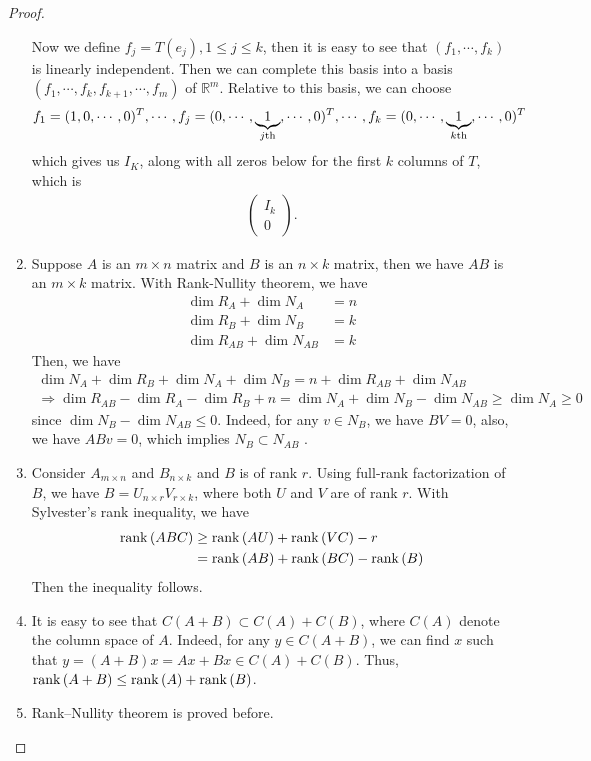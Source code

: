 \documentclass[11pt]{book}
\theoremstyle{definition}
\numberwithin{equation}{chapter}
\begin{document}
\begin{proof}
\begin{enumerate}[label=(\alph*)]
    Now we define $f_j = T(e_j), 1\leq j\leq k$, then it is easy to see that $(f_1, \cdots, f_k)$ is linearly independent. Then we can complete this basis into a basis $(f_1, \cdots, f_k,f_{k+1},\cdots,f_m)$ of $\mathbb{R}^m$. Relative to this basis, we can choose $$f_1 = (1,0,\cdots, 0)^T, \cdots, f_j = (0,\cdots,\underbrace{1}_{j {\rm th}}, \cdots, 0)^T, \cdots, f_k = (0,\cdots,\underbrace{1}_{k {\rm th}}, \cdots, 0)^T$$
    which gives us $I_K$, along with all zeros below for the first $k$ columns of $T$, which is \cite{3}
    \begin{align*}
        \left(
        \begin{matrix}
        I_{k} \\
        0
        \end{matrix}
        \right).
    \end{align*}
    \item Suppose $A$ is an $m\times n$ matrix and $B$ is an $n\times k$ matrix, then we have $AB$ is an $m\times k$ matrix. With Rank-Nullity theorem, we have 
    \begin{align*}
        \dim R_A + \dim N_A & = n \\
        \dim R_B + \dim N_B & = k \\
        \dim R_{AB} + \dim N_{AB} & = k
    \end{align*}
    Then, we have
    \begin{align*}
        \dim N_A + \dim R_B + \dim N_A + \dim N_B = n + \dim R_{AB} + \dim N_{AB} \\
        \Rightarrow \dim R_{AB} - \dim R_A - \dim R_B + n = \dim N_A + \dim N_B - \dim N_{AB} \geq \dim N_A \geq 0
    \end{align*}
    since $\dim N_B - \dim N_{AB}\leq 0$. Indeed, for any $v\in N_B$, we have $BV = 0$, also, we have $ABv = 0$, which implies $N_B\subset N_{AB}$ \cite{4}. 
    \item Consider $A_{m\times n}$ and $B_{n\times k}$ and $B$ is of rank $r$. Using full-rank factorization of $B$, we have $B = U_{n\times r}V_{r\times k}$, where both $U$ and $V$ are of rank $r$\cite{7,5}. With Sylvester’s rank inequality, we have
    \begin{align*}
        {\rm rank}\, (ABC) & \geq {\rm rank}\, (AU) + {\rm rank}\, (VC) - r\\
        & = {\rm rank}\, (AB) + {\rm rank}\, (BC) - {\rm rank}\, (B)
    \end{align*}
    Then the inequality follows\cite{6}.
    \item It is easy to see that $C(A+B)\subset C(A)+C(B)$, where $C(A)$ denote the column space of $A$. Indeed, for any $y\in C(A+B)$, we can find $x$ such that $y = (A+B)x = Ax + Bx\in C(A)+C(B)$. Thus, ${\rm rank}\, (A+B)\leq {\rm rank}\, (A)+{\rm rank}\, (B)$.
    \item Rank–Nullity theorem is proved before.
\end{enumerate}
\end{proof}
\end{document}
